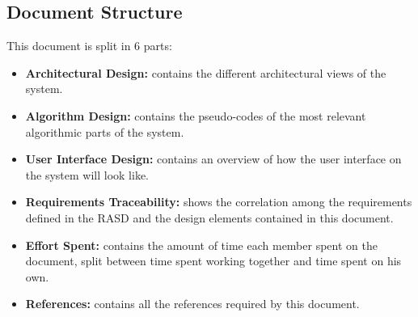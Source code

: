 \subsection{Document Structure}
This document is split in 6 parts:
\begin{itemize}
    \item \textbf{Architectural Design:} contains the different architectural views of the system.
    \item \textbf{Algorithm Design:} contains the pseudo-codes of the most relevant algorithmic parts of the system.
    \item \textbf{User Interface Design:} contains an overview of how the user interface on the system will look like.
    \item \textbf{Requirements Traceability:} shows the correlation among the requirements defined in the RASD and the design elements contained in this document.
    \item \textbf{Effort Spent:} contains the amount of time each member spent on the document, split between time spent working together and time spent on his own.
    \item \textbf{References:} contains all the references required by this document.
\end{itemize}